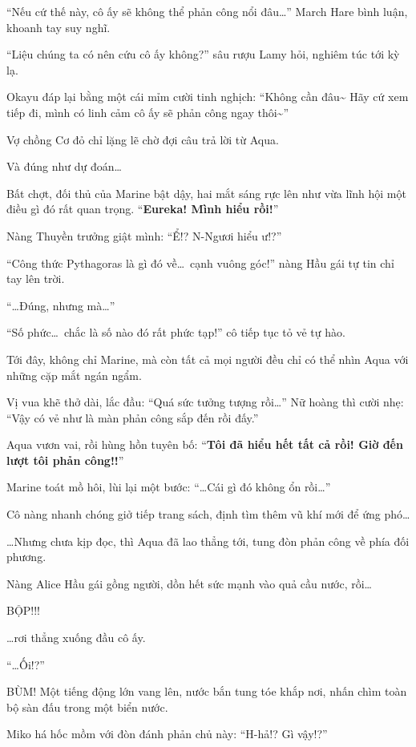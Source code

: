 \documentclass[../main.tex]{subfiles}
\begin{document}
``Nếu cứ thế này, cô ấy sẽ không thể phản công nổi đâu\dots'' March Hare bình luận, khoanh tay suy nghĩ.

``Liệu chúng ta có nên cứu cô ấy không?'' sâu rượu Lamy hỏi, nghiêm túc tới kỳ lạ.

Okayu đáp lại bằng một cái mỉm cười tinh nghịch: ``Không cần đâu\~{} Hãy cứ xem tiếp đi, mình có linh cảm cô ấy sẽ phản công ngay thôi\~{}''

Vợ chồng Cơ đỏ chỉ lặng lẽ chờ đợi câu trả lời từ Aqua.

Và đúng như dự đoán\dots

Bất chợt, đối thủ của Marine bật dậy, hai mắt sáng rực lên như vừa lĩnh hội một điều gì đó rất quan trọng. ``\textbf{Eureka! Mình hiểu rồi!}''

Nàng Thuyền trưởng giật mình: ``Ể!? N-Ngươi hiểu ư!?''

``Công thức Pythagoras là gì đó về\dots\ cạnh vuông góc!'' nàng Hầu gái tự tin chỉ tay lên trời.

``\dots Đúng, nhưng mà\dots''

``Số phức\dots\ chắc là số nào đó rất phức tạp!'' cô tiếp tục tỏ vẻ tự hào.

Tới đây, không chỉ Marine, mà còn tất cả mọi người đều chỉ có thể nhìn Aqua với những cặp mắt ngán ngẩm.

Vị vua khẽ thở dài, lắc đầu: ``Quá sức tưởng tượng rồi\dots'' Nữ hoàng thì cười nhẹ: ``Vậy có vẻ như là màn phản công sắp đến rồi đấy.''

Aqua vươn vai, rồi hùng hồn tuyên bố: ``\textbf{Tôi đã hiểu hết tất cả rồi! Giờ đến lượt tôi phản công!!}''

Marine toát mồ hôi, lùi lại một bước: ``\dots Cái gì đó không ổn rồi\dots''

Cô nàng nhanh chóng giở tiếp trang sách, định tìm thêm vũ khí mới để ứng phó\dots

\dots Nhưng chưa kịp đọc, thì Aqua đã lao thẳng tới, tung đòn phản công về phía đối phương.

Nàng Alice Hầu gái gồng người, dồn hết sức mạnh vào quả cầu nước, rồi\dots\

BỘP!!!

\dots rơi thẳng xuống đầu cô ấy.

``\dots Ối!?''

BÙM! Một tiếng động lớn vang lên, nước bắn tung tóe khắp nơi, nhấn chìm toàn bộ sàn đấu trong một biển nước.

Miko há hốc mồm với đòn đánh phản chủ này: ``H-hả!? Gì vậy!?''
\end{document}
